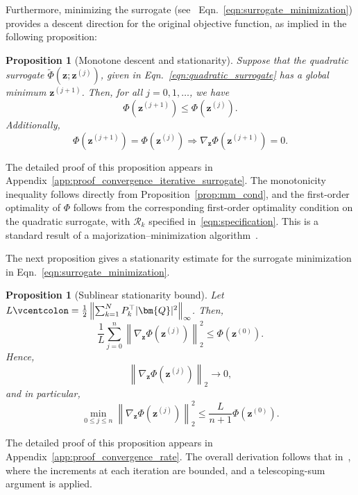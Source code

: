 \documentclass{article}
\numberwithin{equation}{section}
\newcommand{\defeq}{\vcentcolon=}
\newtheorem{proposition}[theorem]{Proposition}
\begin{document}
Furthermore, minimizing the surrogate (see~ Eqn.~\eqref{eqn:surrogate_minimization}) provides a descent direction for the original objective function, as implied in the following proposition:
\begin{proposition}[{Monotone descent and stationarity}]\label{thm:convergence_iterative_surrogate}
Suppose that the quadratic surrogate $\widetilde{\Phi}\left(\bm{z} ; \bm{z}^{(j)}\right)$, given in  Eqn.~\eqref{eqn:quadratic_surrogate} has a global minimum $\bm{z}^{(j+1)}$. Then, for all $j=0,1,\dots$, we have
\begin{equation*}
    \Phi\left(\bm{z}^{(j+1)}\right)\leq\Phi\left(\bm{z}^{(j)}\right).
\end{equation*}
Additionally,
\begin{equation*}
    \Phi\left(\bm{z}^{(j+1)}\right)=\Phi\left(\bm{z}^{(j)}\right)\Longrightarrow \nabla_{\bm{z}}\Phi\left(\bm{z}^{(j+1)}\right) = 0.
\end{equation*}
\end{proposition}
The detailed proof of this proposition appears in Appendix~\ref{app:proof_convergence_iterative_surrogate}. The monotonicity inequality follows directly from Proposition~\ref{prop:mm_cond}, and the first-order optimality of $\Phi$ follows from the corresponding first-order optimality condition on the quadratic surrogate, with $\mathcal{R}_k$ specified in~\eqref{eqn:specification}. This is a standard result of a majorization–minimization algorithm~\cite{mm_convergence}. 

The next proposition gives a stationarity estimate for the surrogate
minimization in Eqn.~\eqref{eqn:surrogate_minimization}.

{\begin{proposition}[Sublinear stationarity bound]\label{thm:convergence_rate}
Let $L\defeq \frac12\left\|\sum_{k=1}^N P_k^\top |\bm{Q}|^2\right\|_\infty$.
Then,
\[
\frac{1}{L}\sum_{j=0}^n
\left\|\nabla_{\bm z}\Phi\left(\bm z^{(j)}\right)\right\|_2^2
\le
\Phi\left(\bm{z}^{(0)}\right).
\]
Hence,
\[
\left\|\nabla_{\bm{z}}\Phi\left(\bm{z}^{(j)}\right)\right\|_2 \to 0,
\]
and in particular,
\[
\min_{0\le j\le n}
\left\|\nabla_{\bm{z}}\Phi\left(\bm{z}^{(j)}\right)\right\|_2^2
\le
\frac{L}{n+1}\Phi\left(\bm{z}^{(0)}\right).
\]
\end{proposition}}
The detailed proof of this proposition appears in Appendix~\ref{app:proof_convergence_rate}. The overall derivation follows that in~\cite{mm_convergence}, where the increments at each iteration are bounded, and a telescoping-sum argument is applied.
\end{document}
